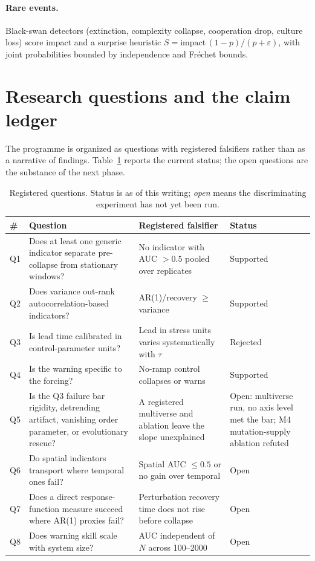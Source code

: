 \documentclass[11pt,a4paper]{article}
\begin{document}
\paragraph{Rare events.} Black-swan detectors (extinction, complexity collapse,
cooperation drop, culture loss) score impact and a surprise heuristic
$S = \text{impact}\,(1-p)/(p+\varepsilon)$, with joint probabilities bounded by
independence and Fr\'echet bounds.

\section{Research questions and the claim ledger}\label{sec:questions}
The programme is organized as questions with registered falsifiers rather than
as a narrative of findings. Table~\ref{tab:questions} reports the current
status; the open questions are the substance of the next phase.

\begin{table}[t]\centering
\caption{Registered questions. Status is as of this writing; \emph{open} means
the discriminating experiment has not yet been run.}\label{tab:questions}
\small
\begin{tabular}{p{0.7cm} p{5.6cm} p{4.4cm} p{2.6cm}}
\toprule
\# & Question & Registered falsifier & Status\\
\midrule
Q1 & Does at least one generic indicator separate pre-collapse from stationary
windows? & No indicator with AUC $> 0.5$ pooled over replicates & Supported\\
Q2 & Does variance out-rank autocorrelation-based indicators? & AR(1)/recovery
$\ge$ variance & Supported\\
Q3 & Is lead time calibrated in control-parameter units? & Lead in stress units
varies systematically with $\tau$ & Rejected\\
Q4 & Is the warning specific to the forcing? & No-ramp control collapses or
warns & Supported\\
Q5 & Is the Q3 failure bar rigidity, detrending artifact, vanishing order
parameter, or evolutionary rescue? & A registered multiverse and ablation leave
the slope unexplained & Open: multiverse run, no axis level met the bar; M4
mutation-supply ablation refuted\\
Q6 & Do spatial indicators transport where temporal ones fail? & Spatial AUC
$\le 0.5$ or no gain over temporal & Open\\
Q7 & Does a direct response-function measure succeed where AR(1) proxies fail? &
Perturbation recovery time does not rise before collapse & Open\\
Q8 & Does warning skill scale with system size? & AUC independent of $N$ across
100--2000 & Open\\
\bottomrule
\end{tabular}
\end{table}
\end{document}
